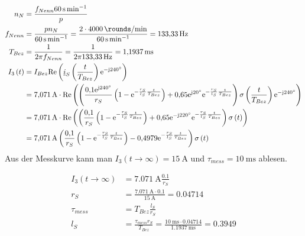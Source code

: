 \documentclass[11pt,a4paper]{scrartcl}
\newcommand{\mybr}[1]{\left(#1\right)}
\renewcommand{\j}{\mathrm{j}}
\renewcommand{\i}{\underline{i}}
\newcommand{\0}{_{\mybr{0}}}
\newcommand{\1}{_{\mybr{1}}}
\newcommand{\2}{_{\mybr{2}}}
\renewcommand{\e}{\mathrm{e}}
\renewcommand{\Re}{\mathrm{Re}}
\begin{document}
\section{}
\begin{align}
n_N&=\frac{f_{Nenn}\SI{60}{\second\per\minute}}{p}\\
f_{Nenn}&=\frac{p n_N}{\SI{60}{\second\per\minute}}=\frac{2\cdot\SI{4000}{\rounds\per\minute}}{\SI{60}{\second\per\minute}}=\SI{133.33}{\hertz}\\
T_{Bez}&=\frac{1}{2\pi f_{Nenn}}=\frac{1}{2\pi\SI{133.33}{\hertz}}=\SI{1.1937}{\milli\second}\\
I_3\mybr{t}&=I_{Bez}\Re\mybr{\i_S\mybr{\frac{t}{T_{Bez}}}\e^{-\j\SI{240}{\degree}}}\\
&=\SI{7.071}{\ampere}\cdot\Re\mybr{\mybr{\frac{\num{0.1}\e^{\j\SI{240}{\degree}}}{r_S}\mybr{1-\e^{-\frac{r_S}{l_S}\frac{t}{T_{Bez}}}}+\num{0.65}\e^{\j\SI{20}{\degree}}\e^{-\frac{r_S}{l_S}\frac{t}{T_{Bez}}}}\sigma\mybr{\frac{t}{T_{Bez}}}\e^{-\j\SI{240}{\degree}}}\\
&=\SI{7.071}{\ampere}\cdot\Re\mybr{\mybr{\frac{\num{0.1}}{r_S}\mybr{1-\e^{-\frac{r_S}{l_S}\frac{t}{T_{Bez}}}}+\num{0.65}\e^{-\j\SI{220}{\degree}}\e^{-\frac{r_S}{l_S}\frac{t}{T_{Bez}}}}\sigma\mybr{t}}\\
&=\SI{7.071}{\ampere}\mybr{\frac{\num{0.1}}{r_S}\mybr{1-\e^{-\frac{r_S}{l_S}\frac{t}{T_{Bez}}}}-\num{0.4979}\e^{-\frac{r_S}{l_S}\frac{t}{T_{Bez}}}}\sigma\mybr{t}\\
\end{align}
Aus der Messkurve kann man $I_3\mybr{t\rightarrow\infty}=\SI{15}{\ampere}$ und $\tau_{mess}=\SI{10}{\milli\second}$ ablesen.
\begin{figure*}[!hp]
	\centering
\end{figure*}
\begin{align}
I_3\mybr{t\rightarrow\infty}&=\SI{7.071}{\ampere}\frac{\num{0.1}}{r_S}\\
r_S&=\frac{\SI{7.071}{\ampere}\cdot\num{0.1}}{\SI{15}{\ampere}}=\num{0.04714}\\
\tau_{mess}&=T_{Bez}\frac{l_S}{r_S}\\
l_S&=\frac{\tau_{mess}r_S}{T_{Bez}}=\frac{\SI{10}{\milli\second}\cdot\num{0.04714}}{\SI{1.1937}{\milli\second}}=\num{0.3949}
\end{align}
\end{document}
